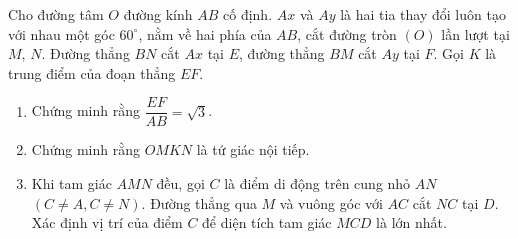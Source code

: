 \begin{ex}
Cho đường tâm $O$ đường kính $AB$ cố định. $Ax$ và $Ay$ là hai tia thay đổi luôn tạo với nhau một góc $60^{\circ}$, nằm về hai phía của $AB$, cắt đường tròn $(O)$ lần lượt tại $M$, $N$. Đường thẳng $BN$ cắt $Ax$ tại $E$, đường thẳng $BM$ cắt $Ay$ tại $F$. Gọi $K$ là trung điểm của đoạn thẳng $EF$.
\begin{enumerate}
\item Chứng minh rằng $\dfrac{EF}{AB}=\sqrt{3}$.
\item Chứng minh rằng $OMKN$ là tứ giác nội tiếp.
\item Khi tam giác $AMN$ đều, gọi $C$ là điểm di động trên cung nhỏ $AN$ $(C \ne A, C \ne N)$. Đường thẳng qua $M$ và vuông góc với $AC$ cắt $NC$ tại $D$. Xác định vị trí của điểm $C$ để diện tích tam giác $MCD$ là lớn nhất.
\end{enumerate}

\end{ex}
